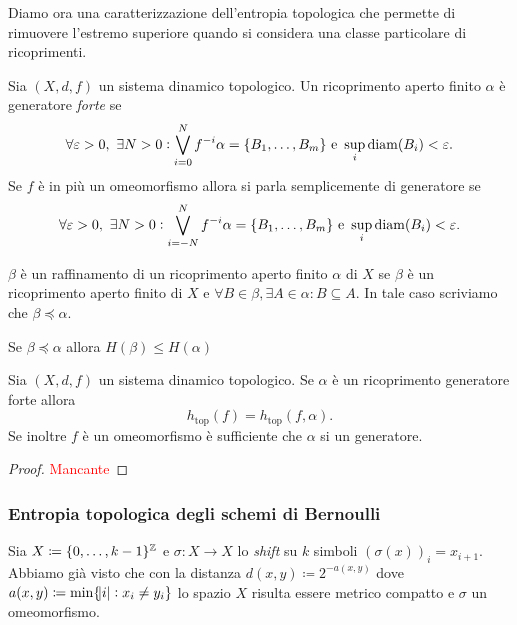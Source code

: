 Diamo ora una caratterizzazione dell'entropia topologica che permette di rimuovere l'estremo superiore quando si considera una classe particolare di ricoprimenti.

\begin{definition}[generatore]
    Sia $ (X, d, f) $ un sistema dinamico topologico. Un ricoprimento aperto finito $ \alpha $ è generatore \emph{forte} se
    \[
        \forall \varepsilon > 0, \ \exists N > 0 : \bigvee_{i=0}^{N}f^{-i}\alpha = \{B_1, \ldots, B_m\} \text{ e } \sup_{i} \mathrm{diam}{(B_i)} < \varepsilon.
    \]
    Se $ f $ è in più un omeomorfismo allora si parla semplicemente di generatore se
    \[
        \forall \varepsilon > 0, \ \exists N > 0 : \bigvee_{i=-N}^{N}f^{-i}\alpha = \{B_1, \ldots, B_m\} \text{ e } \sup_{i} \mathrm{diam}{(B_i)} < \varepsilon.
    \]
\end{definition}

\begin{definition}[raffinamento]
    $ \beta $ è un raffinamento di un ricoprimento aperto finito $ \alpha $ di $ X $ se $ \beta $ è un ricoprimento aperto finito di $ X $ e $ \forall B \in \beta, \exists A \in \alpha : B \subseteq A $. In tale caso scriviamo che $ \beta \preceq \alpha $.
\end{definition}

\begin{exercise}
    Se $ \beta \preceq \alpha $ allora $ H(\beta) \leq H(\alpha) $
\end{exercise}

\begin{thm} \label{thm:entropia-top-generatore}
    Sia $ (X, d, f) $ un sistema dinamico topologico. Se $ \alpha $ è un ricoprimento generatore forte allora
    \[
        h_{\mathrm{top}}(f) = h_{\mathrm{top}}(f, \alpha).
    \]
    Se inoltre $ f $ è un omeomorfismo è sufficiente che $ \alpha $ si un generatore.
\end{thm}
\begin{proof}
    \textcolor{red}{Mancante}
\end{proof}

\subsubsection{Entropia topologica degli schemi di Bernoulli}
Sia $ X \coloneqq \{0, \ldots, k-1\}^{\mathbb{Z}} $ e $ \sigma \colon X \to X $ lo \emph{shift} su $ k $ simboli $ (\sigma(x))_i = x_{i+1} $. Abbiamo già visto che con la distanza $ d(x, y) \coloneqq 2^{-a(x, y)} $ dove $ a(x, y) \coloneqq \min\{\abs{i} : x_{i} \neq y_{i}\} $ lo spazio $ X $ risulta essere metrico compatto e $ \sigma $ un omeomorfismo.\\

